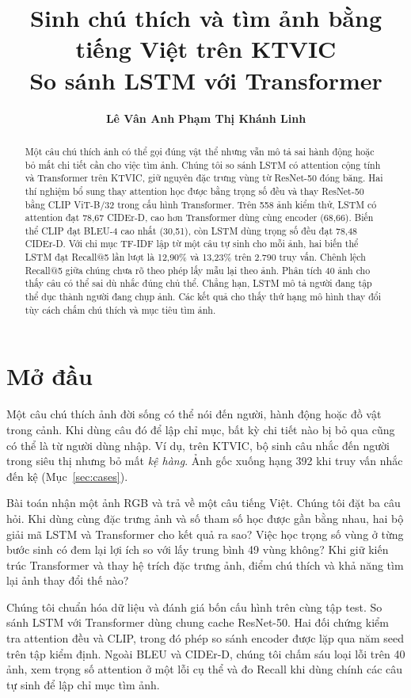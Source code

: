 \documentclass[a4paper,11pt]{article}
\title{Sinh chú thích và tìm ảnh bằng tiếng Việt trên KTVIC\\
So sánh LSTM với Transformer}
\author{\textbf{Lê Vân Anh} \And \textbf{Phạm Thị Khánh Linh}}}
\begin{document}
\maketitle

\begin{abstract}
Một câu chú thích ảnh có thể gọi đúng vật thể nhưng vẫn mô tả sai hành động hoặc bỏ mất chi tiết cần cho việc tìm ảnh. Chúng tôi so sánh LSTM có attention cộng tính và Transformer trên KTVIC, giữ nguyên đặc trưng vùng từ ResNet-50 đóng băng. Hai thí nghiệm bổ sung thay attention học được bằng trọng số đều và thay ResNet-50 bằng CLIP ViT-B/32 trong cấu hình Transformer. Trên 558 ảnh kiểm thử, LSTM có attention đạt 78,67 CIDEr-D, cao hơn Transformer dùng cùng encoder (68,66). Biến thể CLIP đạt BLEU-4 cao nhất (30,51), còn LSTM dùng trọng số đều đạt 78,48 CIDEr-D. Với chỉ mục TF-IDF lập từ một câu tự sinh cho mỗi ảnh, hai biến thể LSTM đạt Recall@5 lần lượt là 12,90\% và 13,23\% trên 2.790 truy vấn. Chênh lệch Recall@5 giữa chúng chưa rõ theo phép lấy mẫu lại theo ảnh. Phân tích 40 ảnh cho thấy câu có thể sai dù nhắc đúng chủ thể. Chẳng hạn, LSTM mô tả người đang tập thể dục thành người đang chụp ảnh. Các kết quả cho thấy thứ hạng mô hình thay đổi tùy cách chấm chú thích và mục tiêu tìm ảnh.
\end{abstract}

\section{Mở đầu}

Một câu chú thích ảnh đời sống có thể nói đến người, hành động hoặc đồ vật trong cảnh. Khi dùng câu đó để lập chỉ mục, bất kỳ chi tiết nào bị bỏ qua cũng có thể là từ người dùng nhập. Ví dụ, trên KTVIC, bộ sinh câu nhắc đến người trong siêu thị nhưng bỏ mất \emph{kệ hàng}. Ảnh gốc xuống hạng 392 khi truy vấn nhắc đến kệ (Mục~\ref{sec:cases}).

Bài toán nhận một ảnh RGB và trả về một câu tiếng Việt. Chúng tôi đặt ba câu hỏi. Khi dùng cùng đặc trưng ảnh và số tham số học được gần bằng nhau, hai bộ giải mã LSTM và Transformer cho kết quả ra sao? Việc học trọng số vùng ở từng bước sinh có đem lại lợi ích so với lấy trung bình 49 vùng không? Khi giữ kiến trúc Transformer và thay hệ trích đặc trưng ảnh, điểm chú thích và khả năng tìm lại ảnh thay đổi thế nào?

Chúng tôi chuẩn hóa dữ liệu và đánh giá bốn cấu hình trên cùng tập test. So sánh LSTM với Transformer dùng chung cache ResNet-50. Hai đối chứng kiểm tra attention đều và CLIP, trong đó phép so sánh encoder được lặp qua năm seed trên tập kiểm định. Ngoài BLEU và CIDEr-D, chúng tôi chấm sáu loại lỗi trên 40 ảnh, xem trọng số attention ở một lỗi cụ thể và đo Recall khi dùng chính các câu tự sinh để lập chỉ mục tìm ảnh.
\end{document}
